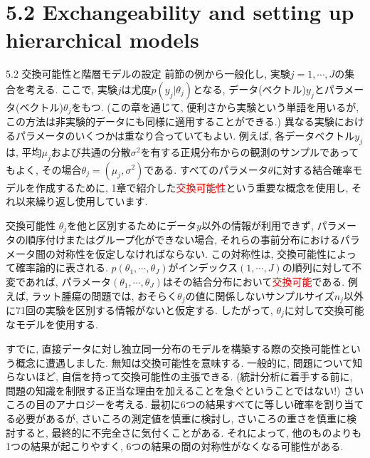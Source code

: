 \documentclass[10pt,dvipdfmx,a4]{beamer}
\newcommand{\tcr}[1]{\textcolor{red}{#1}}
\begin{document}
\section{5.2 Exchangeability and setting up hierarchical models}
\begin{frame}{5.2 交換可能性と階層モデルの設定}
前節の例から一般化し, 実験$j=1,\cdots,J$の集合を考える.
ここで, 実験$j$は尤度$p(y_j|\theta_j)$となる, データ(ベクトル)$y_j$とパラメータ(ベクトル)$\theta_j$をもつ.
(この章を通じて, 便利さから実験という単語を用いるが, この方法は非実験的データにも同様に適用することができる.)
異なる実験におけるパラメータのいくつかは重なり合っていてもよい.
例えば, 各データベクトル$y_j$は, 平均$\mu_j$および共通の分散$\sigma^2$を有する正規分布からの観測のサンプルであってもよく, その場合$\theta_j=(\mu_j, \sigma^2)$である.
すべてのパラメータ$\theta$に対する結合確率モデルを作成するために, 1章で紹介した\tcr{交換可能性}という重要な概念を使用し, それ以来繰り返し使用しています.
\end{frame}


\begin{frame}{交換可能性}
$\theta_j$を他と区別するためにデータ$y$以外の情報が利用できず, パラメータの順序付けまたはグループ化ができない場合, それらの事前分布におけるパラメータ間の対称性を仮定しなければならない.
この対称性は, 交換可能性によって確率論的に表される.
$p(\theta_1,\cdots,\theta_J)$がインデックス$(1,\cdots,J)$の順列に対して不変であれば, パラメータ$(\theta_1,\cdots,\theta_J)$はその結合分布において\tcr{交換可能}である.
例えば, ラット腫瘍の問題では, おそらく$\theta_j$の値に関係しないサンプルサイズ$n_j$以外に71回の実験を区別する情報がないと仮定する.
したがって, $\theta_j$に対して交換可能なモデルを使用する.

すでに, 直接データに対し独立同一分布のモデルを構築する際の交換可能性という概念に遭遇しました.
無知は交換可能性を意味する.
一般的に, 問題について知らないほど, 自信を持って交換可能性の主張できる.
(統計分析に着手する前に, 問題の知識を制限する正当な理由を加えることを急ぐということではない!)
さいころの目のアナロジーを考える.
最初に6つの結果すべてに等しい確率を割り当てる必要があるが, さいころの測定値を慎重に検討し, さいころの重さを慎重に検討すると, 最終的に不完全さに気付くことがある.
それによって, 他のものよりも1つの結果が起こりやすく, 6つの結果の間の対称性がなくなる可能性がある.
\end{frame}

\end{document}
